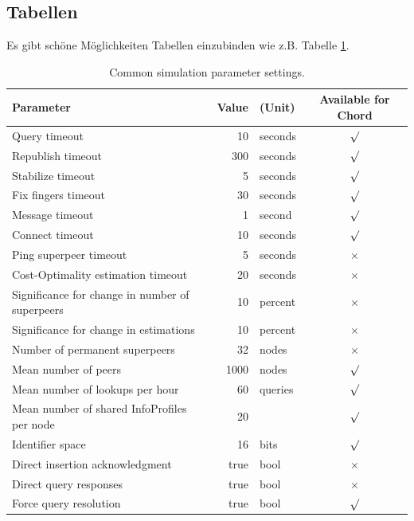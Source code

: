 \subsection{Tabellen}
Es gibt schöne Möglichkeiten Tabellen einzubinden wie z.B. Tabelle \ref{tab:CommonParameterSettings}.
\begin{center}
\begin{table}[htbp]
{\small
\begin{center}
\begin{tabular}[center]{lrlc}
\toprule
Parameter & Value & (Unit) & Available for Chord \\
\midrule
Query timeout & 10 & seconds & $\surd$ \\
Republish timeout & 300 & seconds & $\surd$ \\ %
Stabilize timeout & 5 & seconds & $\surd$ \\
Fix fingers timeout & 30 & seconds & $\surd$ \\
Message timeout & 1 & second & $\surd$ \\
Connect timeout & 10 & seconds & $\surd$ \\
Ping superpeer timeout & 5 & seconds & $\times$ \\
Cost-Optimality estimation timeout & 20 & seconds & $\times$ \\
Significance for change in number of superpeers & 10 & percent & $\times$ \\
Significance for change in estimations  & 10 & percent & $\times$ \\
Number of permanent superpeers & 32 & nodes & $\times$ \\
Mean number of peers & 1000 & nodes & $\surd$ \\
Mean number of lookups per hour & 60 & queries & $\surd$ \\
Mean number of shared InfoProfiles per node & 20 & & $\surd$ \\
Identifier space & 16 & bits & $\surd$ \\
Direct insertion acknowledgment & true & bool & $\times$ \\
Direct query responses & true & bool & $\times$ \\
Force query resolution & true & bool & $\surd$  \\
\bottomrule
\end{tabular}
\end{center}
} %
\caption[Simulation parameter settings]{Common simulation parameter settings.\label{tab:CommonParameterSettings}}
\end{table}
\end{center}

